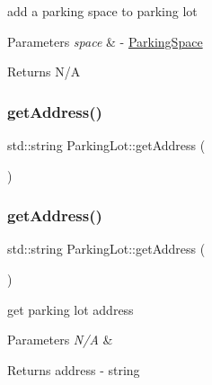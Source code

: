 add a parking space to parking lot 


\begin{DoxyParams}{Parameters}
{\em space} & -\/ \mbox{\hyperlink{class_parking_space}{Parking\+Space}} \\
\hline
\end{DoxyParams}
\begin{DoxyReturn}{Returns}
N/A 
\end{DoxyReturn}
\mbox{\label{class_parking_lot_ab98122d5436d034705ac94f09fde28ae}} 
\subsubsection{\texorpdfstring{get\+Address()}{getAddress()}\hspace{0.1cm}{\footnotesize\ttfamily [1/2]}}
{\footnotesize\ttfamily std\+::string Parking\+Lot\+::get\+Address (\begin{DoxyParamCaption}{ }\end{DoxyParamCaption})}

\mbox{\label{class_parking_lot_ab98122d5436d034705ac94f09fde28ae}} 
\subsubsection{\texorpdfstring{get\+Address()}{getAddress()}\hspace{0.1cm}{\footnotesize\ttfamily [2/2]}}
{\footnotesize\ttfamily std\+::string Parking\+Lot\+::get\+Address (\begin{DoxyParamCaption}{ }\end{DoxyParamCaption})}



get parking lot address 


\begin{DoxyParams}{Parameters}
{\em N/A} & \\
\hline
\end{DoxyParams}
\begin{DoxyReturn}{Returns}
address -\/ string 
\end{DoxyReturn}
\mbox{\label{class_parking_lot_a645ab3d930184975d74814aea73cd684}} 
